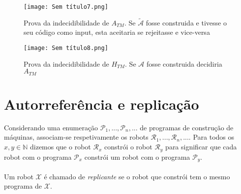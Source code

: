 \documentclass[10pt,a4paper]{report}
\begin{document}
\begin{figure}[H]
\begin{minipage}{.5\textwidth}
\centering
\texttt{[image: Sem título7.png]}
\caption{Prova da indecidibilidade de $A_{TM}$. Se $\widetilde{\mathcal{A}}$ fosse construida e tivesse o seu código como input, esta aceitaria se rejeitasse e vice-versa} 
\end{minipage}%
\begin{minipage}{.5\textwidth}
\centering
\texttt{[image: Sem título8.png]}
\caption{Prova da indecidibilidade de $H_{TM}$. Se $\mathcal{A}$ fosse construida decidiria $A_{TM}$} 
\end{minipage}
\end{figure}

\section{Autorreferência e replicação}
Considerando uma enumeração $\mathcal{P}_1, ..., \mathcal{P}_n, ...$ de programas de construção de máquinas, associam-se respetivamente os robots $\mathcal{R}_1, ..., \mathcal{R}_n, ...$. Para todos os $x, y \in \mathbb{N}$ dizemos que o robot $\mathcal{R}_x$ constrói o robot $\mathcal{R}_y$ para significar que cada robot com o programa $\mathcal{P}_x$ constrói um robot
com o programa $\mathcal{P}_y$.\\
\\
Um robot $\mathcal{X}$ é chamado de \textit{replicante} se o robot que constrói tem o mesmo programa de $\mathcal{X}$.
\end{document}

